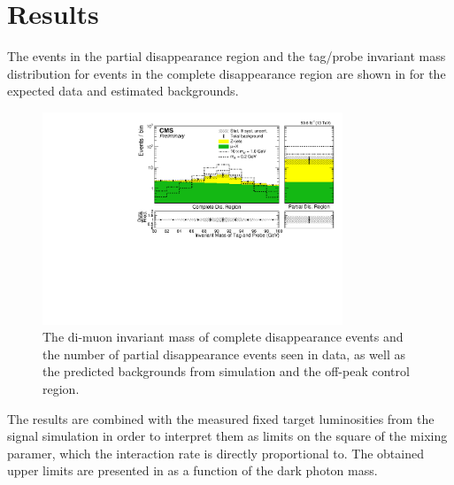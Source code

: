 \chapter{Results}
\label{results}

The events in the partial disappearance region and the tag/probe invariant mass distribution for events in the complete disappearance region are shown in  for the expected data and estimated backgrounds.

\begin{figure}[htbp]
	\centering
	\includegraphics[width=0.8\textwidth]{figures/bdtScore_partialDisappearanceBDT_0p2.pdf}
	\caption[Observed Signal Region Events]{The di-muon invariant mass of complete disappearance events and the number of partial disappearance events seen in data, as well as the predicted backgrounds from simulation and the off-peak control region.}
	\label{fig:invMassResult}
\end{figure}

The results are combined with the measured fixed target luminosities from the signal simulation in order to interpret them as limits on the square of the mixing paramer, which the \dbrem interaction rate is directly proportional to.
The obtained upper limits are presented in  as a function of the dark photon mass. 

